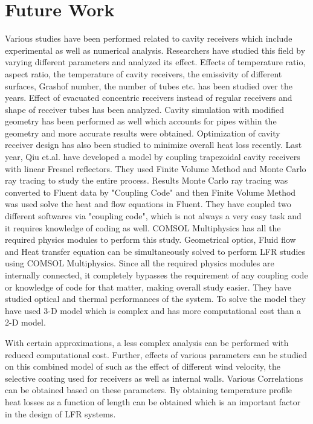 \chapter{Future Work} \label{ch4}
Various studies have been performed related to cavity receivers which include experimental as well as numerical analysis. Researchers have studied this field by varying different parameters and analyzed its effect. Effects of temperature ratio, aspect ratio, the temperature of cavity receivers, the emissivity of different surfaces, Grashof number, the number of tubes etc. has been studied over the years. Effect of evacuated concentric receivers instead of regular receivers and shape of receiver tubes has been analyzed. Cavity simulation with modified geometry has been performed as well which accounts for pipes within the geometry and more accurate results were obtained. Optimization of cavity receiver design has also been studied to minimize overall heat loss recently. Last year, Qiu et.al.\citep{QIU2016129} have developed a model by coupling trapezoidal cavity receivers with linear Fresnel reflectors. They used Finite Volume Method and Monte Carlo ray tracing to study the entire process. Results Monte Carlo ray tracing was converted to Fluent data  by "Coupling Code" and then Finite Volume Method was used solve the heat and flow equations in Fluent. They have coupled two different softwares via "coupling code", which is not always a very easy task and it requires knowledge of coding as well. COMSOL Multiphysics has all the required physics modules to perform this study. Geometrical optics, Fluid flow and Heat transfer equation can be simultaneously solved to perform LFR studies using COMSOL Multiphysics. Since all the required physics modules are internally connected, it completely bypasses the requirement of any coupling code or knowledge of code for that matter, making overall study easier.	 They have studied optical and thermal performances of the system. To solve the model they have used 3-D model which is complex and has more computational cost than a 2-D model. 

With certain approximations, a less complex analysis can be performed with reduced computational cost. Further, effects of various parameters can be studied on this combined model of such as the effect of different wind velocity, the selective coating used for receivers as well as internal walls. Various Correlations can be obtained based on these parameters. By obtaining temperature profile heat losses as a function of length can be obtained which is an important factor in the design of LFR systems\citep{bellos2016experimental}.













